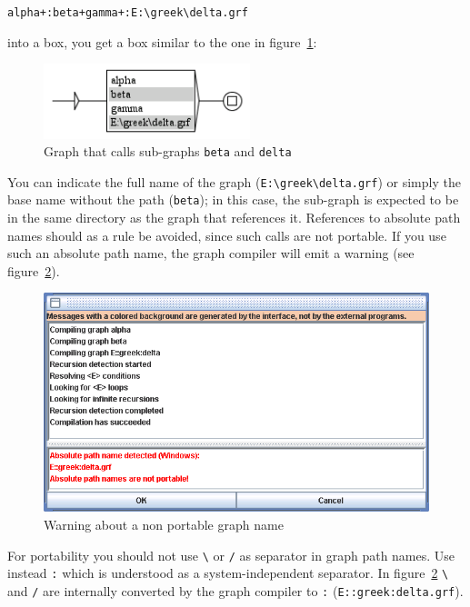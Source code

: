 \bigskip
\verb$alpha+:beta+gamma+:E:\greek\delta.grf$

\bigskip
\noindent into a box, you get a box similar to the one in
figure~\ref{fig-subgraph-call}:

\medskip
\begin{figure}[h]
\begin{center}
\includegraphics[width=6cm]{resources/img/fig5-7.png}
\caption{Graph that calls sub-graphs \texttt{beta} and
\texttt{delta}\label{fig-subgraph-call}}
\end{center}
\end{figure}

\noindent You can indicate the full name of the graph
(\verb$E:\greek\delta.grf$) or simply the base name without the path (\verb$beta$); 
in this case, the sub-graph is expected to be in the same directory as the graph that references
it. References to absolute path names should as a rule be avoided, since such
calls are not portable. If you use such an absolute path name, the graph compiler
will emit a warning (see figure~\ref{fig-warning-absolute-graph-name}).

\begin{figure}[!h]
\begin{center}
\includegraphics[width=14.5cm]{resources/img/fig5-8.png}
\caption{Warning about a non portable graph
name\label{fig-warning-absolute-graph-name}}
\end{center}
\end{figure}


\bigskip
\noindent For portability you should not use \verb+\+ or \verb+/+ as separator
in graph path names. Use instead \verb+:+ which is understood as a
system-independent separator. In figure~\ref{fig-warning-absolute-graph-name}
\verb+\+ and \verb+/+ are internally converted by the graph compiler to \verb+:+
(\verb+E::greek:delta.grf+).


